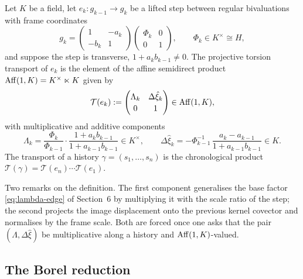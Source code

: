 \begin{definition}
\label{def:torsion-transport}
Let $K$ be a field, let $e_k:g_{k-1}\to g_k$ be a lifted step between regular
bivaluations with frame coordinates
\begin{equation}\label{eq:frame-lift}
  g_k=\begin{pmatrix}1&-a_k\\-b_k&1\end{pmatrix}
      \begin{pmatrix}\Phi_k&0\\0&1\end{pmatrix},
  \qquad \Phi_k\in K^{\times}\cong H,
\end{equation}
and suppose the step is transverse, $1+a_kb_{k-1}\ne0$.  The projective torsion
transport of $e_k$ is the element of the affine semidirect product
$\operatorname{Aff}(1,K)=K^{\times}\ltimes K$ given by
\begin{equation}\label{eq:torsion-transport}
  \mathcal T(e_k):=\begin{pmatrix}\Lambda_k&\Delta\hat\xi_k\\[2pt]0&1\end{pmatrix}
  \in\operatorname{Aff}(1,K),
\end{equation}
with multiplicative and additive components
\begin{equation}\label{eq:torsion-components}
  \Lambda_k=\frac{\Phi_k}{\Phi_{k-1}}\cdot\frac{1+a_kb_{k-1}}{1+a_{k-1}b_{k-1}}
  \in K^{\times},
  \qquad
  \Delta\hat\xi_k=-\Phi_{k-1}^{-1}\,\frac{a_k-a_{k-1}}{1+a_{k-1}b_{k-1}}\in K .
\end{equation}
The transport of a history $\gamma=(s_1,\dots,s_n)$ is the chronological
product $\mathcal T(\gamma)=\mathcal T(e_n)\cdots\mathcal T(e_1)$.
\end{definition}

Two remarks on the definition.  The first component generalises the base factor
\eqref{eq:lambda-edge} of Section~6 by multiplying it with the scale ratio of the
step; the second projects the image displacement onto the previous kernel
covector and normalises by the frame scale.  Both are forced once one asks that
the pair $(\Lambda,\Delta\hat\xi)$ be multiplicative along a history and
$\operatorname{Aff}(1,K)$-valued.

\subsection{The Borel reduction}

